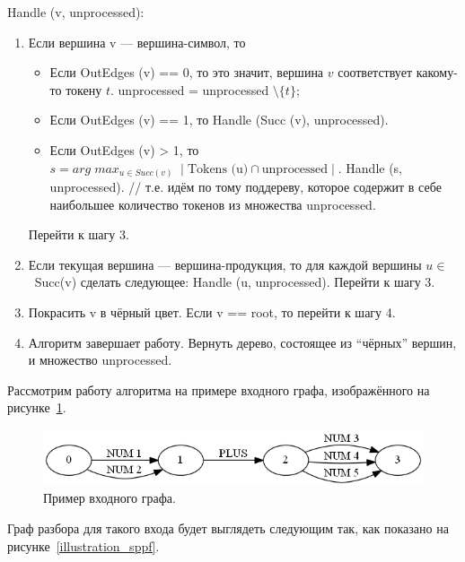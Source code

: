 Handle (v, unprocessed):
\begin{enumerate}
\item Если вершина v --- вершина-символ, то 
    \begin{itemize}
        \item Если OutEdges (v) == 0, то это значит, вершина $v$ соответствует какому-то токену $t$. unprocessed = unprocessed $\setminus \{t\}$; 
        \item Если OutEdges (v) == 1, то Handle (Succ (v), unprocessed).
        \item Если OutEdges (v) > 1, то 	$s = arg \; max_{u \in Succ(v)} \; \mid \mbox{Tokens (u)} \cap \mbox{unprocessed} \mid$. Handle (s, unprocessed). // т.е. идём по тому поддереву, которое содержит в себе наибольшее количество токенов из множества unprocessed. 
    \end{itemize}
    Перейти к шагу 3.
\item Если текущая вершина --- вершина-продукция, то для каждой вершины $u \in$~Succ(v) сделать следующее:  Handle (u, unprocessed). Перейти к шагу 3.
\item Покрасить v в чёрный цвет. Если v == root, то перейти к шагу 4.
\item Алгоритм завершает работу. Вернуть дерево, состоящее из ``чёрных'' вершин, и множество unprocessed. 
\end{enumerate}

Рассмотрим работу алгоритма на примере входного графа, изображённого на рисунке~\ref{illustration_input}.

\begin{figure}[t]
\centering
\includegraphics[width=\linewidth]{Ivanov/Pictures/Illustration.png}
\caption{Пример входного графа.}
\label{illustration_input}
\end{figure}

Граф разбора для такого входа будет выглядеть следующим так, как показано на рисунке~\ref{illustration_sppf}.

